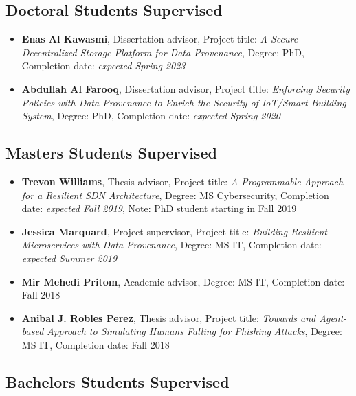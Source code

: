 
\hypertarget{phd-students}{%
\subsection{Doctoral Students Supervised}\label{phd-students}}

\begin{itemize}
\tightlist
\item \textbf{Enas Al Kawasmi}, Dissertation advisor, Project title: \textit{A Secure Decentralized Storage Platform for Data Provenance}, Degree: PhD, Completion date: \textit{expected Spring 2023}
\item \textbf{Abdullah Al Farooq}, Dissertation advisor, Project title: \textit{Enforcing Security Policies with Data Provenance to Enrich the Security of IoT/Smart Building System}, Degree: PhD, Completion date: \textit{expected Spring 2020}
\end{itemize}

\hypertarget{ms-students}{%
\subsection{Masters Students Supervised}\label{ms-students}}

\begin{itemize}
\tightlist
\item \textbf{Trevon Williams}, Thesis advisor, Project title: \textit{A Programmable Approach for a Resilient SDN Architecture}, Degree: MS Cybersecurity, Completion date: \textit{expected Fall 2019}, Note: PhD student starting in Fall 2019
\item \textbf{Jessica Marquard}, Project supervisor, Project title: \textit{Building Resilient Microservices with Data Provenance}, Degree: MS IT, Completion date: \textit{ expected Summer 2019}
\item \textbf{Mir Mehedi Pritom}, Academic advisor, Degree: MS IT, Completion date: Fall 2018
\item \textbf{Anibal J. Robles Perez}, Thesis advisor, Project title: \textit{Towards and Agent-based Approach to Simulating Humans Falling for Phishing Attacks}, Degree: MS IT, Completion date: Fall 2018
\end{itemize}

\hypertarget{bs-students}{%
\subsection{Bachelors Students Supervised}\label{bs-students}}

